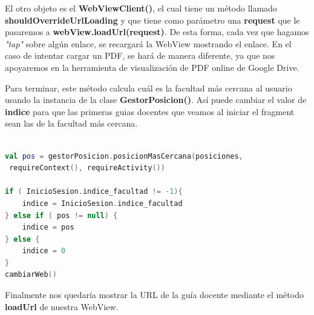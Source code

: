 El otro objeto es el \textbf{WebViewClient()}, el cual tiene un método llamado \textbf{shouldOverrideUrlLoading} y que tiene como parámetro una \textbf{request} que le pasaremos a \textbf{webView.loadUrl(request)}. De esta forma, cada vez que hagamos \textit{"tap"} sobre algún enlace, se recargará la WebView mostrando el enlace. En el caso de intentar cargar un PDF, se hará de manera diferente, ya que nos apoyaremos en la herramienta de visualización de PDF online de Google Drive.

Para terminar, este método calcula cuál es la facultad más cercana al usuario usando la instancia de la clase \textbf{GestorPosicion()}. Así puede cambiar el valor de \textbf{indice} para que las primeras guias docentes que veamos al iniciar el fragment sean las de la facultad más cercana.

\begin{lstlisting}[language=Kotlin]

val pos = gestorPosicion.posicionMasCercana(posiciones,
 requireContext(), requireActivity())

if ( InicioSesion.indice_facultad != -1){
	indice = InicioSesion.indice_facultad
} else if ( pos != null) {
	indice = pos
} else {
	indice = 0
}
cambiarWeb()

\end{lstlisting}

Finalmente nos quedaría mostrar la URL de la guía docente mediante el método \textbf{loadUrl} de nuestra WebView.

\newpage

